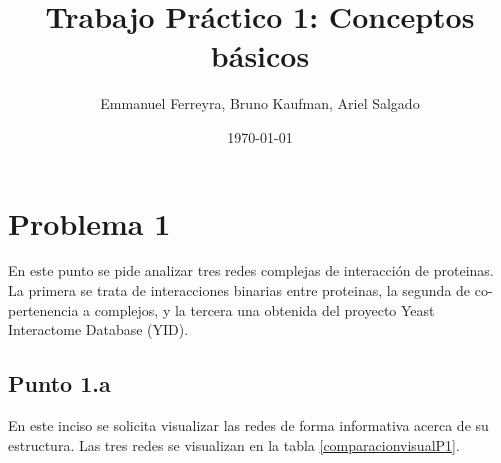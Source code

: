 \documentclass{article}
\title{Trabajo Práctico 1: Conceptos básicos}
\author{Emmanuel Ferreyra, Bruno Kaufman, Ariel Salgado}
\date{\today}
\begin{document}
\maketitle

\section{Problema 1}
En este punto se pide analizar tres redes complejas de interacción de proteinas. La primera se trata de interacciones binarias entre proteinas, la segunda de co-pertenencia a complejos, y la tercera una obtenida del proyecto Yeast Interactome Database (YID).

\subsection{Punto 1.a}
En este inciso se solicita visualizar las redes de forma informativa acerca de su estructura. Las tres redes se visualizan en la tabla \ref{comparacionvisualP1}.
\end{document}
